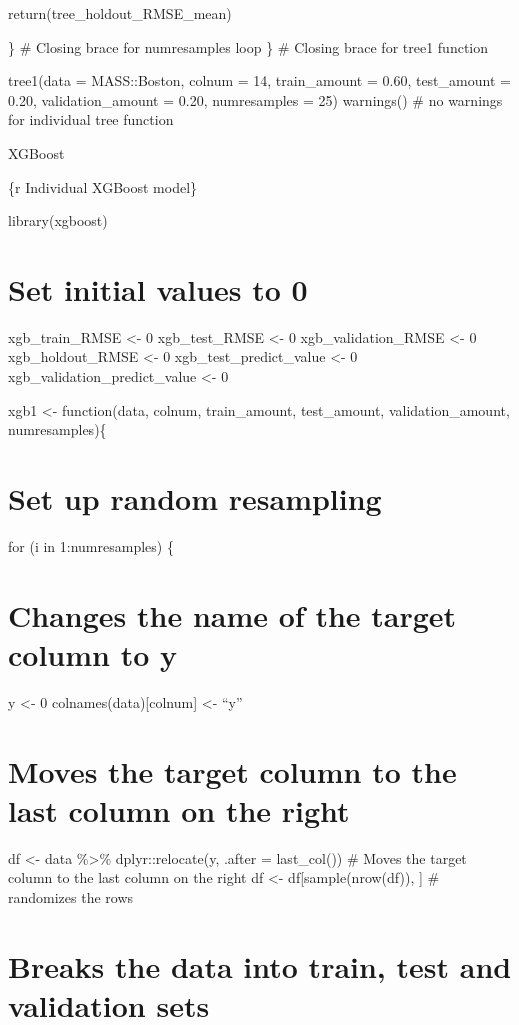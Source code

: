 \documentclass[
]{book}
\begin{document}
return(tree\_holdout\_RMSE\_mean)

\} \# Closing brace for numresamples loop \} \# Closing brace for tree1
function

tree1(data = MASS::Boston, colnum = 14, train\_amount = 0.60, test\_amount
= 0.20, validation\_amount = 0.20, numresamples = 25) warnings() \# no
warnings for individual tree function

XGBoost

\{r Individual XGBoost model\}

library(xgboost)

\chapter{Set initial values to 0}\label{set-initial-values-to-0-21}

xgb\_train\_RMSE \textless- 0 xgb\_test\_RMSE \textless- 0 xgb\_validation\_RMSE \textless- 0
xgb\_holdout\_RMSE \textless- 0 xgb\_test\_predict\_value \textless- 0
xgb\_validation\_predict\_value \textless- 0

xgb1 \textless- function(data, colnum, train\_amount, test\_amount,
validation\_amount, numresamples)\{

\chapter{Set up random resampling}\label{set-up-random-resampling-17}

for (i in 1:numresamples) \{

\chapter{Changes the name of the target column to y}\label{changes-the-name-of-the-target-column-to-y-17}

y \textless- 0 colnames(data){[}colnum{]} \textless- ``y''

\chapter{Moves the target column to the last column on the right}\label{moves-the-target-column-to-the-last-column-on-the-right-17}

df \textless- data \%\textgreater\% dplyr::relocate(y, .after = last\_col()) \# Moves the
target column to the last column on the right df \textless-
df{[}sample(nrow(df)), {]} \# randomizes the rows

\chapter{Breaks the data into train, test and validation sets}\label{breaks-the-data-into-train-test-and-validation-sets-17}
\end{document}
